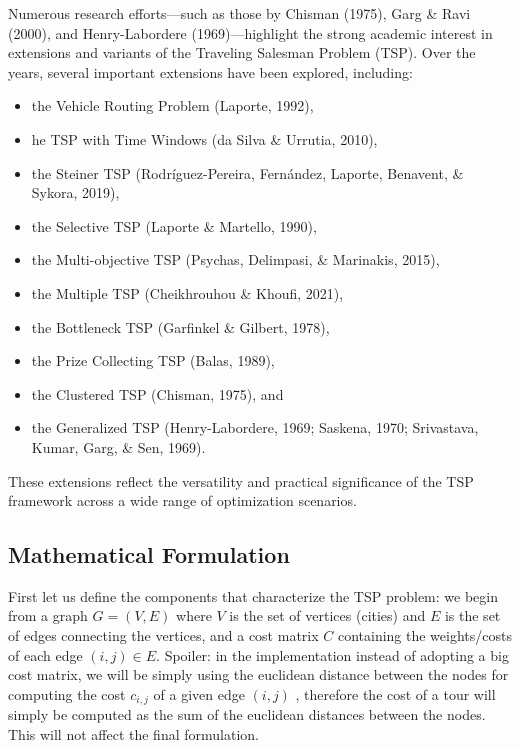 \documentclass{article}
\begin{document}
Numerous research efforts—such as those by Chisman (1975), Garg \& Ravi (2000), and Henry-Labordere (1969)—highlight the strong academic 
interest in extensions and variants of the Traveling Salesman Problem (TSP). Over the years, several important extensions have been explored, 
including:
\begin{itemize}
	\item the Vehicle Routing Problem (Laporte, 1992),

	\item he TSP with Time Windows (da Silva \& Urrutia, 2010),
	
	\item the Steiner TSP (Rodríguez-Pereira, Fernández, Laporte, Benavent, \& Sykora, 2019),
	
	\item the Selective TSP (Laporte \& Martello, 1990),
	
	\item the Multi-objective TSP (Psychas, Delimpasi, \& Marinakis, 2015),
	
	\item the Multiple TSP (Cheikhrouhou \& Khoufi, 2021),
	
	\item the Bottleneck TSP (Garfinkel \& Gilbert, 1978),
	
	\item the Prize Collecting TSP (Balas, 1989),
	
	\item the Clustered TSP (Chisman, 1975), and
	
	\item the Generalized TSP (Henry-Labordere, 1969; Saskena, 1970; Srivastava, Kumar, Garg, \& Sen, 1969).
\end{itemize}


These extensions reflect the versatility and practical significance of the TSP framework across a wide range of optimization scenarios.


\subsection{Mathematical Formulation}
First let us define the components that characterize the TSP problem: we begin from a graph $G = (V, E)$ where $V$ is the set of vertices (cities) and $E$ is the set of edges connecting the vertices, and a cost matrix $C$ containing the weights/costs of each edge $(i, j) \in E$. 
Spoiler: in the implementation instead of adopting a big cost matrix, we will be simply using the euclidean distance between the nodes for computing the cost $c_{i, j}$ of a given edge $(i, j)$ , therefore the cost of a tour will simply be computed as the sum of the euclidean distances between the nodes. This will not affect the final formulation.   
\end{document}
